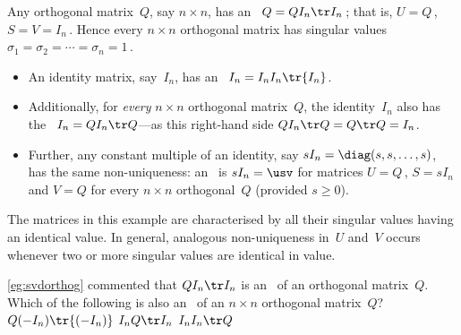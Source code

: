 \begin{example} \label{eg:svdorthog}
Any orthogonal matrix~\(Q\), say \(n\times n\), has an \svd\ \(Q=QI_n\tr I_n\)\,; that is, \(U=Q\)\,, \(S=V=I_n\)\,. 
Hence every \(n\times n\) orthogonal matrix has singular values \(\sigma_1=\sigma_2=\cdots=\sigma_n=1\)\,.
\end{example}


\begin{example} \label{eg:svdnonuniq}
\begin{itemize}
\item An identity matrix, say~\(I_n\), has an \svd\ \(I_n=I_nI_n\tr{I_n}\).  
\item Additionally, for \emph{every} \(n\times n\) orthogonal matrix~\(Q\), the identity~\(I_n\) also has the \svd\ \(I_n=QI_n\tr Q\)---as this right-hand side \(QI_n\tr Q=Q\tr Q=I_n\).
\item Further, any constant multiple of an identity, say \(sI_n=\diag(s,s,\ldots,s)\), has the same non-uniqueness: an \svd\ is \(sI_n=\usv\) for matrices \(U=Q\)\,, \(S=sI_n\) and \(V=Q\) for every \(n\times n\) orthogonal~\(Q\) (provided \(s\geq0\)).
\end{itemize}
The matrices in this example are characterised by all their singular values having an identical value. 
In general, analogous non-uniqueness in~\(U\) and~\(V\) occurs whenever two or more singular values are identical in value.
\end{example}




\begin{activity}
\autoref{eg:svdorthog} commented that \(QI_n\tr I_n\) is an \svd\ of an orthogonal matrix~\(Q\).  
Which of the following is also an \svd\ of an \(n\times n\) orthogonal matrix~\(Q\)?
{\(Q(-I_n)\tr{(-I_n)}\)}
{\(I_nQ\tr I_n\)}
{\(I_nI_n\tr Q\)}
\end{activity}





